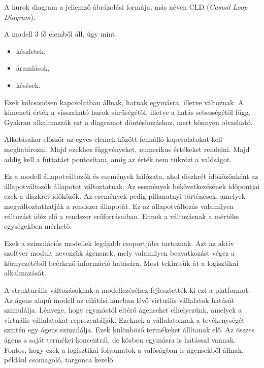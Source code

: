 A hurok diagram a jellemző ábrázolási formája, más néven CLD (\textit{Casual Loop Diagram}).

A modell 3 fő elemből áll, úgy mint
\begin{itemize}
	\item készletek,
	\item áramlások,
	\item késések.
\end{itemize}

Ezek kölcsönösen kapcsolatban állnak, hatnak egymásra, illetve változnak.
A kimeneti érték a visszaható hurok sűrűségétől, illetve a hatás sebességétől függ. 
Gyakran alkalmazzák ezt a diagramot döntéshozáshoz, mert könnyen olvasható.

Alkotásakor először az egyes elemek között fennálló kapcsolatokat kell meghatározni. Majd ezekhez függvényeket, numerikus értékeket rendelni. Majd addig kell a futtatást pontosítani, amíg az érték nem tükrözi a valóságot.


Ez a modell állapotváltozók és események hálózata, ahol diszkrét időközönként az állapotváltozók állapotot változtatnak.
Az események bekövetkezésének időpontjai ezek a diszkrét időközök. Az események pedig pillanatnyi történések, amelyek megváltoztathatják a rendszer állapotát.
Ez az állapotváltozás valamilyen változást idéz elő a rendszer erőforrásaiban. Ennek a változásnak a mértéke egységekben mérhető.


Ezek a szimulációs modellek legújabb csoportjába tartoznak. Azt az aktív szoftver modult nevezzük ágensnek, mely valamilyen beavatkozást végez a környezetéből beérkező információ hatására. 
Most tekintsük át a logisztikai alkalmazását. 

A strukturális változásoknak a modellezéséhez fejlesztették ki ezt a platformot. Az ágens alapú modell az ellátási láncban lévő virtuális vállalatok hatását szimulálja. Lényege, hogy egymástól eltérő ágenseket elhelyezünk, amelyek a virtuális vállalatokat reprezentálják. Ezeknek a vállalatoknak a tevékenységét szintén egy ágens szimulálja. Ezek különböző termékeket állítanak elő. Az összes ágens a saját termékei koncentrál, de közben egymásra is hatással vannak. Fontos, hogy ezek a logisztikai folyamatok a valóságban is ágensekből állnak, például csomagoló, targonca kezelő. 



